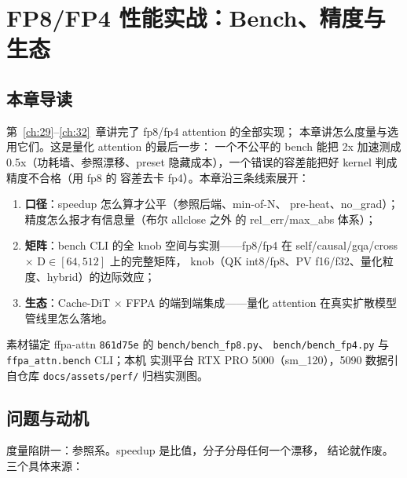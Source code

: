 \chapter{FP8/FP4 性能实战：Bench、精度与生态}\label{ch:33}

\section{本章导读}

第~\ref{ch:29}--\ref{ch:32}~章讲完了 fp8/fp4 attention 的全部实现；
本章讲怎么度量与选用它们。这是量化 attention 的最后一步：
一个不公平的 bench 能把 2x 加速测成 0.5x（功耗墙、参照漂移、preset
隐藏成本），一个错误的容差能把好 kernel 判成精度不合格（用 fp8 的
容差去卡 fp4）。本章沿三条线索展开：
\begin{enumerate}[itemsep=0pt,topsep=2pt]
  \item \textbf{口径}：speedup 怎么算才公平（参照后端、min-of-N、
        pre-heat、no\_grad）；精度怎么报才有信息量（布尔 allclose 之外
        的 rel\_err/max\_abs 体系）；
  \item \textbf{矩阵}：bench CLI 的全 knob 空间与实测——fp8/fp4 在
        self/causal/gqa/cross $\times$ D$\in[64,512]$ 上的完整矩阵，
        knob（QK int8/fp8、PV f16/f32、量化粒度、hybrid）的边际效应；
  \item \textbf{生态}：Cache-DiT $\times$ FFPA 的端到端集成——量化
        attention 在真实扩散模型管线里怎么落地。
\end{enumerate}
素材锚定 ffpa-attn \texttt{861d75e} 的 \texttt{bench/bench\_fp8.py}、
\texttt{bench/bench\_fp4.py} 与 \texttt{ffpa\_attn.bench} CLI；本机
实测平台 RTX PRO 5000（sm\_120），5090 数据引自仓库
\texttt{docs/assets/perf/} 归档实测图。

\section{问题与动机}

度量陷阱一：参照系。speedup 是比值，分子分母任何一个漂移，
结论就作废。三个具体来源：

